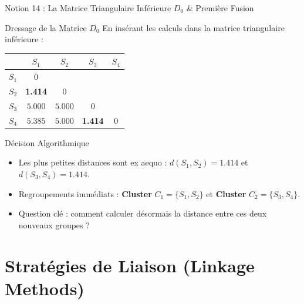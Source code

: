 \documentclass[aspectratio=169,10pt]{beamer}
\begin{document}
\begin{frame}{Notion 14 : La Matrice Triangulaire Inférieure $D_0$ \& Première Fusion}
  \begin{conceptbox}{Dressage de la Matrice $D_0$}
    \footnotesize
    En insérant les calculs dans la matrice triangulaire inférieure :
    \begin{center}
      \small
      \begin{tabular}{c|cccc}
        & $S_1$ & $S_2$ & $S_3$ & $S_4$ \\
        \hline
        $S_1$ & $0$ & & & \\
        $S_2$ & \cellcolor{BioGreen!25}\textbf{1.414} & $0$ & & \\
        $S_3$ & $5.000$ & $5.000$ & $0$ & \\
        $S_4$ & $5.385$ & $5.000$ & \cellcolor{BioGreen!25}\textbf{1.414} & $0$ \\
      \end{tabular}
    \end{center}
  \end{conceptbox}
  \vspace{0.5mm}
  \begin{biobox}{Décision Algorithmique}
    \footnotesize
    \begin{itemize}
      \item Les plus petites distances sont ex aequo : $d(S_1, S_2) = 1.414$ et $d(S_3, S_4) = 1.414$.
      \item Regroupements immédiats : \textbf{Cluster} $C_1 = \{S_1, S_2\}$ et \textbf{Cluster} $C_2 = \{S_3, S_4\}$.
      \item Question clé : comment calculer désormais la distance entre ces deux nouveaux groupes ?
    \end{itemize}
  \end{biobox}
\end{frame}

\section{Stratégies de Liaison (Linkage Methods)}
\end{document}
